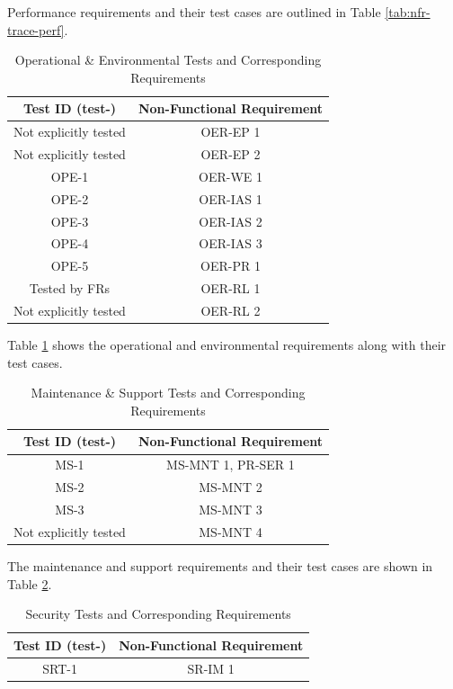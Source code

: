 \documentclass[12pt, titlepage]{article}
\begin{document}
Performance requirements and their test cases are outlined in Table \ref{tab:nfr-trace-perf}.

  \begin{table}[H]
    \centering
    \caption{Operational \& Environmental Tests and Corresponding Requirements}
    \begin{tabular}{cc}
      \toprule \textbf{Test ID (test-)} & \textbf{Non-Functional Requirement} \\
      \midrule
      Not explicitly tested & OER-EP 1 \\
      Not explicitly tested & OER-EP 2 \\
      OPE-1 & OER-WE 1 \\
      OPE-2 & OER-IAS 1 \\
      OPE-3 & OER-IAS 2 \\
      OPE-4 & OER-IAS 3 \\
      OPE-5 & OER-PR 1 \\
      Tested by FRs & OER-RL 1 \\
      Not explicitly tested & OER-RL 2 \\
      \bottomrule
    \end{tabular}
    \label{tab:nfr-trace-ope}
  \end{table}

Table \ref{tab:nfr-trace-ope} shows the operational and environmental requirements along with their test cases.

  \begin{table}[H]
    \centering
    \caption{Maintenance \& Support Tests and Corresponding Requirements}
    \begin{tabular}{cc}
      \toprule \textbf{Test ID (test-)} & \textbf{Non-Functional Requirement} \\
      \midrule
      MS-1 & MS-MNT 1, PR-SER 1 \\
      MS-2 & MS-MNT 2 \\
      MS-3 & MS-MNT 3 \\
      Not explicitly tested & MS-MNT 4 \\
      \bottomrule
    \end{tabular}
    \label{tab:nfr-trace-ms}
  \end{table}

The maintenance and support requirements and their test cases are shown in Table \ref{tab:nfr-trace-ms}.

\begin{table}[H]
  \centering
  \caption{Security Tests and Corresponding Requirements}
  \begin{tabular}{cc}
    \toprule \textbf{Test ID (test-)} & \textbf{Non-Functional Requirement} \\
    \midrule
    SRT-1 & SR-IM 1 \\
    \bottomrule
  \end{tabular}
  \label{tab:nfr-trace-sec}
\end{table}
\end{document}
